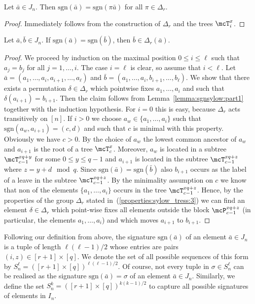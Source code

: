 \documentclass[a4paper,UKenglish]{lipics}
\newcommand{\inseg}[1]{\ensuremath{[#1]}}
\newcommand{\sgn}{\ensuremath{\textrm{sgn}}}
\newcommand{\ba}{{\bar a}}
\newcommand{\bb}{{\bar b}}
\theoremstyle{plain}
\begin{document}
\begin{lemma}
\label{lemma:sgnsylow:part1}
 Let $\ba \in J_n$. Then $\sgn(\ba) = \sgn(\pi \ba)$ for all $\pi \in 
\Delta_r$.
\end{lemma}
\begin{proof}
 Immediately follows from the construction of $\Delta_r$ and the trees
$\mcT_i^x$.
\end{proof}


\begin{lemma}
Let $\ba, \bb \in J_n$. If $\sgn(\ba) = \sgn(\bb)$, then $\bb \in
\Delta_r(\ba)$.
\end{lemma}
\begin{proof}
 We proceed by induction on the maximal position $0 \leq i \leq \ell$ such that
$a_j = b_j$ for all $j=1, \dots, i$. The case $i = \ell$ is clear, so assume
that $i < \ell$.
Let $\ba = (a_1, \dots, a_i, a_{i+1}, \dots, a_\ell)$ and $\bb = (a_1, \dots,
a_i, b_{i+1}, \dots, b_\ell)$. We show that there exists a permutation $\delta
\in \Delta_r$ which pointwise fixes $a_1, \dots, a_i$ and such that
$\delta(a_{i+1}) = b_{i+1}$. Then the claim follows from
Lemma~\ref{lemma:sgnsylow:part1} together with the induction hypothesis.
For $i = 0$ this is easy, because $\Delta_r$ acts transitively on $\inseg
n$. If $i > 0$ we choose $a_w \in \{ a_1, \dots, a_i \}$ such that
$\sgn(a_w, a_{i+1}) = (c,d)$ and such that $c$ is minimal with this 
property.
Obviously we
have $c > 0$. By the choice of $a_w$ the lowest common ancestor of
$a_w$ and $a_{i+1}$ is the root of a tree $\mcT_c^x$. Moreover, $a_w$ is
located in a subtree $\mcT_{c-1}^{xq +y}$ for some $0 \leq y \leq q-1$ and
$a_{i+1}$ is located in the subtree $\mcT_{c-1}^{xq +z}$ where $z = y + d
\mod q$. Since $\sgn(\ba) = \sgn(\bb)$ also $b_{i+1}$ occurs as the label of a
leave in the subtree $\mcT_{c-1}^{xq +z}$.
By the minimality assumption on $c$ we know that non of the elements 
$\{ a_1, \dots, a_i \}$ occurs in the tree $\mcT_{c-1}^{xq +z}$.
Hence, by the
properties of the group $\Delta_r$ stated in~(\ref{properties:sylow_tress:3})
we can find an element $\delta \in \Delta_r$ which point-wise fixes all elements
outside the block $\mcP_{c-1}^{xq +z}$ (in particular, the elements $a_1, \dots,
a_i$) and which moves $a_{i+1}$ to $b_{i+1}$. 
\end{proof}


Following our definition from above, the signature $\sgn(\ba)$ of an element 
$\ba \in J_n$ is a tuple of length $\ell (\ell -1) / 2$ whose entries are pairs 
$(i, z) \in \inseg{r+1} \times  \inseg q$. We denote the set of all possible 
sequences of this form by $S^\ell_n = (\inseg{r+1} \times \inseg q)^{\ell (\ell 
-1) / 2}$. Of course, not every tuple in $\sigma \in S_n^\ell$ can be
realised as the signature $\sgn(\ba)=\sigma$ of an element $\ba \in J_n$. 
Similarly, we define the set $S^k_n = (\inseg{r+1} \times \inseg q)^{k (k 
-1) / 2}$ to capture all possible signatures of elements in $I_n$.
\end{document}
